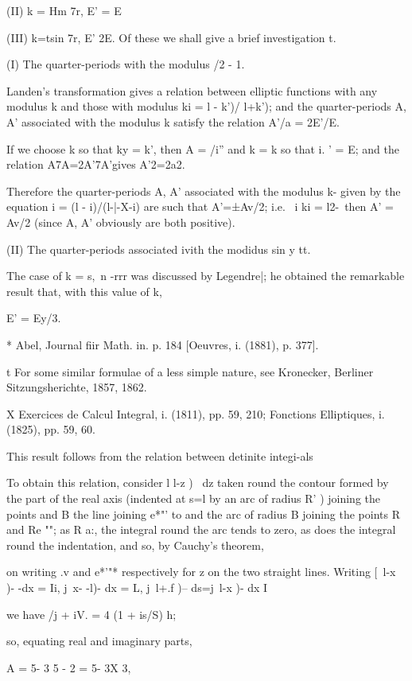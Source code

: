 (II) k = Hm 7r, E' = E %

(III) k=tsin 7r, E' 2E. Of these we shall give a brief investigation
t.

(I) The quarter-periods with the modulus /2 - 1.

Landen's transformation gives a relation between elliptic functions
with any modulus k and those with modulus ki = l - k')/ l+k'); and the
quarter-periods A, A' associated with the modulus k satisfy the
relation A'/a = 2E'/E.

If we choose k so that ky = k', then A = /i'' and k = k so that i. ' =
E; and the relation A7A=2A'7A'gives A'2=2a2.

Therefore the quarter-periods A, A' associated with the modulus k-
given by the equation i = (l - i)/(l-|-X-i) are such that A'=±Av/2;
i.e. \ i ki = l2-\, then A' = Av/2 (since A, A' obviously are both
positive).

(II) The quarter-periods associated ivith the modidus sin y tt.

The case of k = s,\ n -rrr was discussed by Legendre|; he obtained the
remarkable result that, with this value of k,

E' = Ey/3.

* Abel, Journal fiir Math. in. p. 184 [Oeuvres, i. (1881), p. 377].

t For some similar formulae of a less simple nature, see Kronecker,
Berliner Sitzungsherichte, 1857, 1862.

X Exercices de Calcul Integral, i. (1811), pp. 59, 210; Fonctions
Elliptiques, i. (1825), pp. 59, 60.

%
%

This result follows from the relation between detinite integi-als

To obtain this relation, consider l l-z )~ dz taken round the contour
formed by the part of the real axis (indented at s=l by an arc of
radius R' ) joining the points and B the line joining e*"' to and the
arc of radius B joining the points R and Re ""; as R a:, the
integral round the arc tends to zero, as does the integral round the
indentation, and so, by Cauchy's theorem,

on writing .v and e*'"* respectively for z on the two straight lines.
Writing [\ l-x )- -dx = Ii, j\ x- -l)- dx = L, j\ l+.f )-- ds=j\ l-x
)- dx I

we have /j + iV. = 4 (1 + is/S) h;

so, equating real and imaginary parts,

A = 5- 3 5 - 2 = 5- 3X 3,

